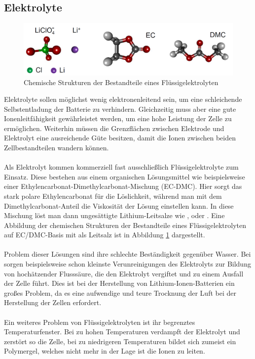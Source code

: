 \documentclass[a4paper, 11pt, headsepline,footsepline,twoside,abstract]{scrbook}
\begin{document}
\subsection{Elektrolyte}
\begin{figure}
	\centering
	\includegraphics[width=1.0\columnwidth]{images/fluessigelektrolyt.png}
	\caption{Chemische Strukturen der Bestandteile eines Flüssigelektrolyten}
	\label{fluessigelektrolyt}
\end{figure}
Elektrolyte sollen möglichst wenig elektronenleitend sein, um eine schleichende Selbstentladung der Batterie zu verhindern. Gleichzeitig muss aber eine gute Ionenleitfähigkeit gewährleistet werden, um eine hohe Leistung der Zelle zu ermöglichen. Weiterhin müssen die Grenzflächen zwischen Elektrode und Elektrolyt eine ausreichende Güte besitzen, damit die Ionen zwischen beiden Zellbestandteilen wandern können.
\\\\
Als Elektrolyt kommen kommerziell fast ausschließlich Flüssigelektrolyte zum Einsatz. Diese bestehen aus einem organischen Lösungsmittel wie beispielsweise einer Ethylencarbonat-Dimethylcarbonat-Mischung (EC-DMC). Hier sorgt das stark polare Ethylencarbonat für die Löslichkeit, während man mit dem Dimethylcarbonat-Anteil die Viskosität der Lösung einstellen kann. In diese Mischung löst man dann ungesättigte Lithium-Leitsalze wie ,  oder . Eine Abbildung der chemischen Strukturen der Bestandteile eines Flüssigelektrolyten auf EC/DMC-Basis mit  als Leitsalz ist in Abbildung \ref{fluessigelektrolyt} dargestellt.
\\\\
Problem dieser Lösungen sind ihre schlechte Beständigkeit gegenüber Wasser. Bei  sorgen beispielsweise schon kleinste Verunreinigungen des Elektrolyts zur Bildung von hochätzender Flusssäure, die den Elektrolyt vergiftet und zu einem Ausfall der Zelle führt. Dies ist bei der Herstellung von Lithium-Ionen-Batterien ein großes Problem, da es eine aufwendige und teure Trocknung der Luft bei der Herstellung der Zellen erfordert.
\\\\
Ein weiteres Problem von Flüssigelektrolyten ist ihr begrenztes Temperaturfenster. Bei zu hohen Temperaturen verdampft der Elektrolyt und zerstört so die Zelle, bei zu niedrigeren Temperaturen bildet sich zumeist ein Polymergel, welches nicht mehr in der Lage ist die Ionen zu leiten.
\end{document}
